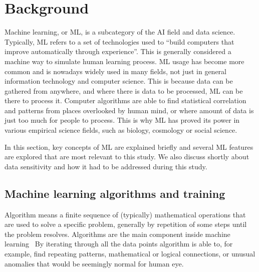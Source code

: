

\section{Background}\label{sec:background}

Machine learning, or ML,
is a subcategory of the AI field and data science.
Typically, ML refers to
a set of technologies used to \enquote{build computers
that improve automatically through experience}.\cite{jordan2015machine}
This is generally considered a machine way
to simulate human learning process.
ML usage has become more common
and is nowadays widely used in many fields,
not just in general information technology and computer science.
This is because data can be gathered from anywhere,
and where there is data to be processed,
ML can be there to process it.
Computer algorithms are able to find 
statistical correlation and patterns
from places overlooked by human mind,
or where amount of data is just too much 
for people to process.
This is why ML has proved its power
in various empirical science fields,
such as biology, cosmology or social science.\cite{jordan2015machine}

In this section, 
key concepts of ML are explained briefly
and several ML features are explored 
that are most relevant to this study.
We also discuss shortly about data sensitivity
and how it had to be addressed during this study.



\subsection{Machine learning algorithms and training}\label{subsec:bg-machine-learning}

Algorithm means a finite sequence of (typically) mathematical operations
that are used to solve a specific problem,
generally by repetition of some steps
until the problem resolves.\cite{merriam2022algorithm}
Algorithms are the main component inside machine learning~
By iterating through all the data points
algorithm is able to, for example,
find repeating patterns,
mathematical or logical connections,
or unusual anomalies that would be seemingly normal for human eye.


